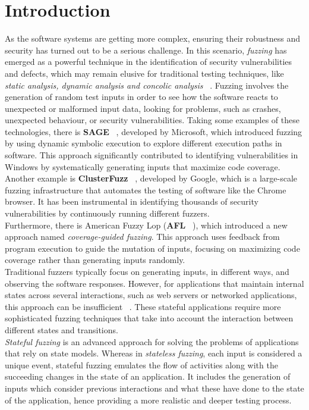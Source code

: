 \chapter{Introduction}

As the software systems are getting more complex, ensuring their robustness and security has turned out to be a serious challenge. In this scenario, \textit{fuzzing} has emerged as a powerful technique in the identification of security vulnerabilities and defects, which may remain elusive for traditional testing techniques, like \textit{static analysis, dynamic analysis and concolic analysis} ~\cite{vulndiscover}. Fuzzing involves the generation of random test inputs in order to see how the software reacts to unexpected or malformed input data, looking for problems, such as crashes, unexpected behaviour, or security vulnerabilities.
Taking some examples of these technologies, there is \textbf{SAGE} ~\cite{sage}, developed by Microsoft, which introduced fuzzing by using dynamic symbolic execution to explore different execution paths in software. This approach significantly contributed to identifying vulnerabilities in Windows by systematically generating inputs that maximize code coverage.
\\Another example is \textbf{ClusterFuzz} ~\cite{ossfuzz}, developed by Google, which is a large-scale fuzzing infrastructure that automates the testing of software like the Chrome browser. It has been instrumental in identifying thousands of security vulnerabilities by continuously running different fuzzers.
\\Furthermore, there is American Fuzzy Lop (\textbf{AFL} ~\cite{afl}), which introduced a new approach named \textit{coverage-guided fuzzing}. This approach uses feedback from program execution to guide the mutation of inputs, focusing on maximizing code coverage rather than generating inputs randomly.
\\Traditional fuzzers typically focus on generating inputs, in different ways, and observing the software responses. However, for applications that maintain internal states across several interactions, such as web servers or networked applications, this approach can be insufficient ~\cite{statefulfuzzingchallenges}. These stateful applications require more sophisticated fuzzing techniques that take into account the interaction between different states and transitions.
\\\textit{Stateful fuzzing} is an advanced approach for solving the problems of applications that rely on state models. Whereas in \textit{stateless fuzzing}, each input is considered a unique event, stateful fuzzing emulates the flow of activities along with the succeeding changes in the state of an application. It includes the generation of inputs which consider previous interactions and what these have done to the state of the application, hence providing a more realistic and deeper testing process.
